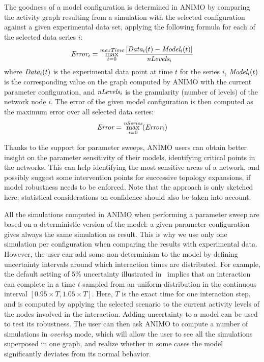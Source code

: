 \documentclass[submission,copyright,creativecommons]{eptcs}
\begin{document}
The goodness of a model configuration is determined in ANIMO by comparing the activity graph
resulting from a simulation with the selected configuration
against a given experimental data set, applying the following formula for each of the selected data series $i$:
$$
\mbox{\it Error}_i = \max_{t = 0}^{\mbox{\it \scriptsize maxTime}} \frac{|\mbox{\it Data}_i(t) - \mbox{\it Model}_i(t)|}{\mbox{\it nLevels}_i}\\
$$
where $\mbox{\it Data}_i(t)$ is the experimental data point at time $t$ for the series $i$,
$\mbox{\it Model}_i(t)$ is the corresponding value on the graph computed by ANIMO
with the current parameter configuration, and $\mbox{\it nLevels}_i$
is the granularity (number of levels) of the network node $i$.
The error of the given model configuration is then computed as the maximum error over
all selected data series:
$$
\mbox{\it Error} = \max_{i = 0}^{\mbox{\it \scriptsize nSeries}}(\mbox{\it Error}_i)
$$

Thanks to the support for parameter sweeps, ANIMO users can obtain better insight on the
parameter sensitivity of their models, identifying critical points in the networks.
This can help identifying the most sensitive
areas of a network, and possibly suggest some intervention points for successive topology expansions,
if model robustness needs to be enforced. Note that the approach is only sketched here:
statistical considerations on confidence should also be taken into account.

All the simulations computed in ANIMO when performing a parameter sweep are based on
a deterministic version of the model: a given parameter configuration gives always the same
simulation as result. This is why we use only one simulation per configuration
when comparing the results with experimental data. However, the user can add some
non-determinism to the model by defining uncertainty intervals around which interaction
times are distributed. For example, the default setting of 5\% uncertainty illustrated in~\cite{animo-ieee}
implies that an interaction can complete in a time $t$ sampled from an uniform distribution
in the continuous interval $[0.95 \times T, 1.05 \times T]$.
Here, $T$ is the exact time for one interaction step, and is computed by applying
the selected scenario to the current activity levels of the nodes involved in the interaction.
Adding uncertainty to a model can be used to test its robustness. The user can then
ask ANIMO to compute a number of simulations in \emph{overlay} mode,
which will allow the user to see all the simulations superposed in one graph,
and realize whether in some cases the model significantly deviates from its normal behavior.
\end{document}
